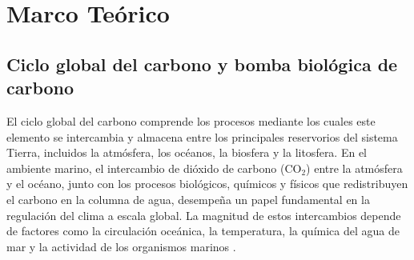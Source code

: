 \chapter{Marco Teórico}

\section{Ciclo global del carbono y bomba biológica de carbono }

El ciclo global del carbono comprende los procesos mediante los cuales este elemento se intercambia y almacena entre los principales reservorios del sistema Tierra, incluidos la atmósfera, los océanos, la biosfera y la litosfera. En el ambiente marino, el intercambio de dióxido de carbono (CO$_2$) entre la atmósfera y el océano, junto con los procesos biológicos, químicos y físicos que redistribuyen el carbono en la columna de agua, desempeña un papel fundamental en la regulación del clima a escala global. La magnitud de estos intercambios depende de factores como la circulación oceánica, la temperatura, la química del agua de mar y la actividad de los organismos marinos \citep{HainSigman2014}.

